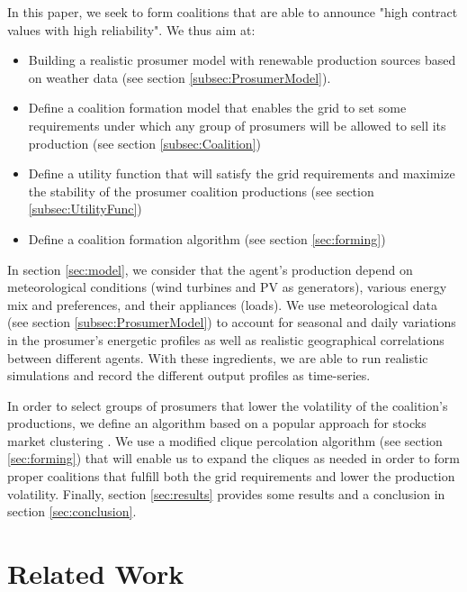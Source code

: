 \documentclass[conference]{IEEEtran}
\begin{document}
In this paper, we seek to form coalitions that are able to announce "high contract values with high reliability". We thus aim at:
\begin{itemize}
\item Building a realistic prosumer model with renewable production sources based on weather data (see section \ref{subsec:ProsumerModel}).
\item Define a coalition formation model that enables the grid to set some requirements under which any group of prosumers will be allowed to sell its production (see section \ref{subsec:Coalition})
\item Define a utility function that will satisfy the grid requirements and maximize the stability of the prosumer coalition productions (see section \ref{subsec:UtilityFunc})
\item Define a coalition formation algorithm (see section \ref{sec:forming})
\end{itemize}

In section \ref{sec:model}, we consider that the agent's production depend on meteorological conditions (wind turbines and PV as generators), various energy mix and preferences, and their appliances (loads). We use meteorological data (see section \ref{subsec:ProsumerModel}) to account for seasonal and daily variations in the prosumer's energetic profiles as well as realistic geographical correlations between different agents. With these ingredients, we are able to run realistic simulations and record the different output profiles as time-series.

In order to select groups of prosumers that lower the volatility of the coalition's productions, we define an algorithm based on a popular approach for stocks market clustering \cite{Mantegna1999}. We use a modified clique percolation algorithm (see section \ref{sec:forming}) that will enable us to expand the cliques as needed in order to form proper coalitions that fulfill both the grid requirements and lower the production volatility. Finally, section \ref{sec:results} provides some results and a conclusion in section \ref{sec:conclusion}.

%
%

\section{Related Work}
\label{sec:related}
\end{document}
